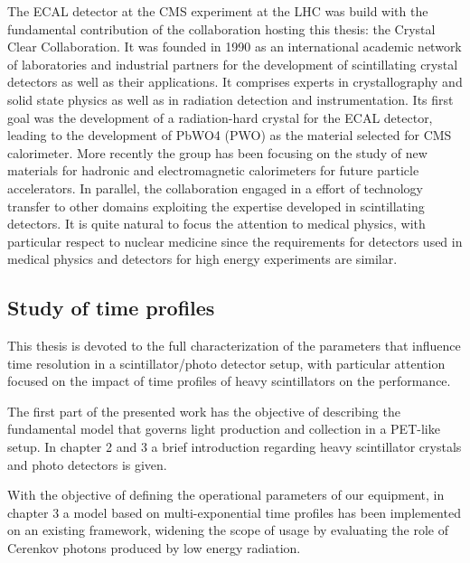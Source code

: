 The ECAL detector at the CMS experiment at the LHC was build with the fundamental contribution of the collaboration hosting this thesis: the Crystal Clear Collaboration. It was founded in 1990 as an international academic network of laboratories and industrial partners for the development of scintillating crystal detectors as well as their applications. It comprises experts in crystallography and solid state physics as well as in radiation detection and instrumentation. 
Its first goal was the development of a radiation-hard crystal for the ECAL detector, leading to the development of PbWO4 (PWO) as the material selected for CMS calorimeter. More recently the group has been focusing on the study of new materials for hadronic and electromagnetic calorimeters for future particle accelerators.
In parallel, the collaboration engaged in a effort of technology transfer to other domains exploiting the expertise developed in scintillating detectors. It is quite natural to focus the attention to medical physics, with particular respect to nuclear medicine since the requirements for detectors used in medical physics and detectors for high energy experiments are similar.


\subsection{Study of time profiles}

This thesis is devoted to the full characterization of the parameters that influence time resolution in a scintillator/photo detector setup, with particular attention focused on the impact of time profiles of heavy scintillators on the performance.

The first part of the presented work has the objective of describing the fundamental model that governs light production and collection in a PET-like setup.
In chapter 2 and 3 a brief introduction regarding heavy scintillator crystals and photo detectors is given.

With the objective of defining the operational parameters of our equipment, in chapter 3 a model based on multi-exponential time profiles has been implemented on an existing framework, widening the scope of usage by evaluating the role of Cerenkov photons produced by low energy radiation.

